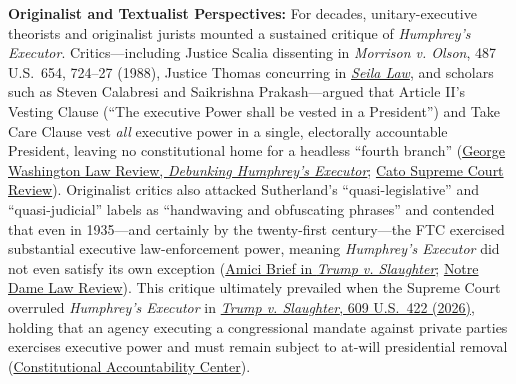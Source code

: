 \documentclass[12pt]{article}
\begin{document}
\textbf{Originalist and Textualist Perspectives:} For decades, unitary-executive theorists and originalist jurists mounted a sustained critique of \textit{Humphrey's Executor}. Critics---including Justice Scalia dissenting in \textit{Morrison v. Olson}, 487 U.S.\ 654, 724--27 (1988), Justice Thomas concurring in \href{https://www.supremecourt.gov/opinions/19pdf/19-7_n6io.pdf}{\textit{Seila Law}}, and scholars such as Steven Calabresi and Saikrishna Prakash---argued that Article II's Vesting Clause (``The executive Power shall be vested in a President'') and Take Care Clause vest \textit{all} executive power in a single, electorally accountable President, leaving no constitutional home for a headless ``fourth branch'' (\href{https://www.gwlr.org/wp-content/uploads/2016/01/83-Geo-Wash-L-Rev-1835.pdf}{George Washington Law Review, \textit{Debunking Humphrey's Executor}}; \href{https://www.cato.org/supreme-court-review/2019-2020/removal-power-critical-guide}{Cato Supreme Court Review}). Originalist critics also attacked Sutherland's ``quasi-legislative'' and ``quasi-judicial'' labels as ``handwaving and obfuscating phrases'' and contended that even in 1935---and certainly by the twenty-first century---the FTC exercised substantial executive law-enforcement power, meaning \textit{Humphrey's Executor} did not even satisfy its own exception (\href{https://www.supremecourt.gov/DocketPDF/25/25-332/384619/20251114165832949_25-332-Brief\%20of\%20Amici.pdf}{Amici Brief in \textit{Trump v. Slaughter}}; \href{https://ndlawreview.org/interring-the-unitary-executive/}{Notre Dame Law Review}). This critique ultimately prevailed when the Supreme Court overruled \textit{Humphrey's Executor} in \href{https://supreme.justia.com/cases/federal/us/609/25-332/}{\textit{Trump v. Slaughter}, 609 U.S.\ 422 (2026)}, holding that an agency executing a congressional mandate against private parties exercises executive power and must remain subject to at-will presidential removal (\href{https://www.theusconstitution.org/litigation/slaughter-v-trump/}{Constitutional Accountability Center}).
\end{document}
